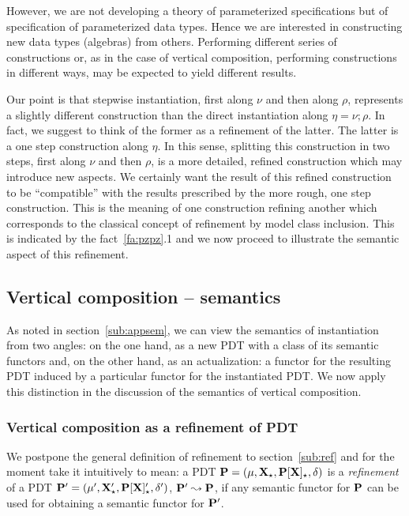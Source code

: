 However,
we are not developing a theory of parameterized specifications but of
specification of parameterized data types. Hence we are interested in
constructing new data types (algebras) from others. 
Performing different series of constructions or, as in the case
of vertical composition, performing constructions in different ways, may be
expected to yield different results. 

Our point is that stepwise instantiation, first along $\nu$ and then along
$\rho$, represents a slightly different construction than the direct instantiation
along $\eta=\nu;\rho$. In fact, we suggest to think of the former as a refinement
of the latter. The latter is a one step construction along $\eta$. In this
sense, splitting this construction in two steps, first along $\nu$ and then
$\rho$, is a more detailed, refined construction which may introduce new
aspects. We certainly want the result of this refined construction to be
``compatible'' with the results prescribed by the more rough, one step
construction. This is the meaning of one construction refining another which
corresponds to the classical concept of refinement by model class
inclusion. This is indicated by the fact~\ref{fa:pzpz}.1 and we now
proceed to illustrate the semantic aspect of this refinement.

\subsection{Vertical composition -- semantics}\label{sub:vcsem}
%
As noted in section~\ref{sub:appsem}, we can view the semantics of
instantiation from two angles: on the one hand, as a new PDT with a class of
its semantic functors and, on the other hand, as an actualization: a functor
for the resulting PDT induced by a
particular functor for the instantiated PDT. We now apply this distinction in
the discussion of the semantics of vertical composition.

\subsubsection{Vertical composition as a refinement of PDT}\label{sub:vertref}
We postpone the general definition of refinement to section~\ref{sub:ref} and for
the moment take it intuitively to mean:
a PDT  $\thr P=\pdt$ is a {\em
refinement} of a PDT  $\thr
P'=\pdtsp{\mu'}{\delta'}{\thr{X'_\cons}}{\thr{P[X]'_\cons}}$, $\thr
P'\leadsto \thr P$, if any semantic 
functor for $\thr P$ can be used for obtaining 
a semantic functor for $\thr P'$.

